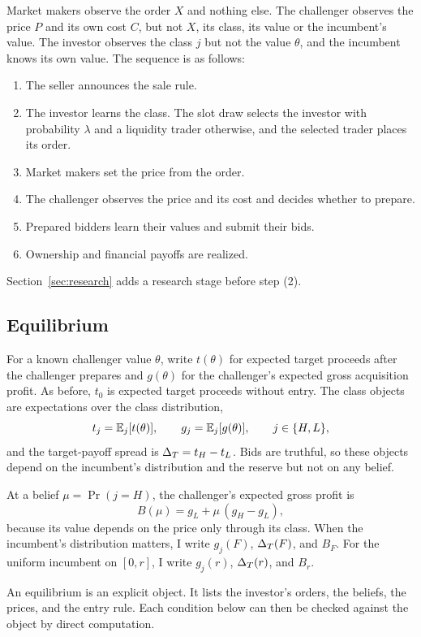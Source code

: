Market makers observe the order \(X\) and nothing else. The challenger observes the price \(P\) and its own cost
\(C\), but not \(X\), its class, its value or the incumbent's value. The investor observes the class \(j\) but not
the value \(\theta\), and the incumbent knows its own value. The sequence is as follows:
\begin{enumerate}[label=(\arabic*),leftmargin=2.5em]
\item The seller announces the sale rule.
\item The investor learns the class. The slot draw selects the investor with probability \(\lambda\) and a
liquidity trader otherwise, and the selected trader places its order.
\item Market makers set the price from the order.
\item The challenger observes the price and its cost and decides whether to prepare.
\item Prepared bidders learn their values and submit their bids.
\item Ownership and financial payoffs are realized.
\end{enumerate}
Section~\ref{sec:research} adds a research stage before step (2).

\subsection{Equilibrium}\label{sec:equilibrium}

For a known challenger value \(\theta\), write \(t(\theta)\) for expected target proceeds after the challenger
prepares and \(g(\theta)\) for the challenger's expected gross acquisition profit. As before, \(t_0\) is expected
target proceeds without entry. The class objects are expectations over the class distribution,
\[
t_j=\mathbb{E}_j[t(\theta)],\qquad g_j=\mathbb{E}_j[g(\theta)],\qquad j\in\{H,L\},
\]
and the target-payoff spread is \(\Delta_T=t_H-t_L\). Bids are truthful, so these objects depend on the incumbent's
distribution and the reserve but not on any belief.

At a belief \(\mu=\Pr(j=H)\), the challenger's expected gross profit is
\[
B(\mu)=g_L+\mu\,(g_H-g_L),
\]
because its value depends on the price only through its class. When the incumbent's distribution matters, I
write \(g_j(F)\), \(\Delta_T(F)\), and \(B_F\). For the uniform incumbent on \([0,r]\), I write \(g_j(r)\),
\(\Delta_T(r)\), and \(B_r\).

An equilibrium is an explicit object. It lists the investor's orders, the beliefs, the prices, and the entry
rule. Each condition below can then be checked against the object by direct computation.

